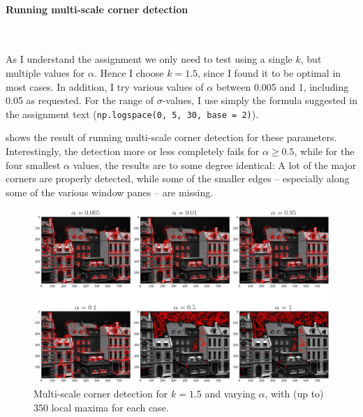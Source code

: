 \paragraph{Running multi-scale corner detection}~\smallskip

As I understand the assignment we only need to test using a single $k$, but
multiple values for $\alpha$. Hence I choose $k = 1.5$, since I found it to be
optimal in most cases. In addition, I try various values of $\alpha$ between
0.005 and 1, including 0.05 as requested. For the range of $\sigma$-values, I
use simply the formula suggested in the assignment text (\texttt{np.logspace(0,
5, 30, base = 2)}).

 shows the result of running multi-scale corner detection for
these parameters. Interestingly, the detection more or less completely fails for
$\alpha \geq 0.5$, while for the four smallest $\alpha$ values, the results are
to some degree identical: A lot of the major corners are properly detected,
while some of the smaller edges -- especially along some of the various window
panes -- are missing.


\begin{figure}[H]
  \centering
  \includegraphics[width=\textwidth]{figures/task_4.png}
  \caption{Multi-scale corner detection for $k = 1.5$ and varying $\alpha$, with
  (up to) 350 local maxima for each case.}
  \label{fig:task_4}
\end{figure}

